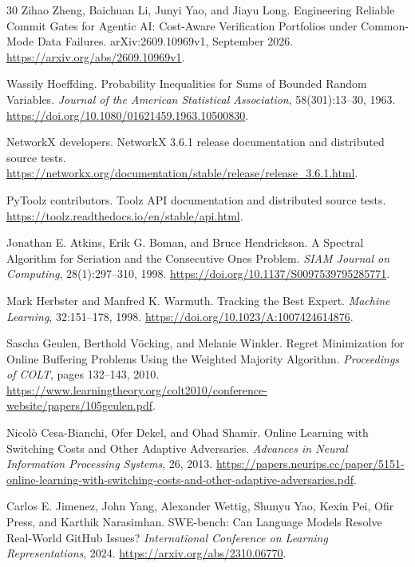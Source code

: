 \begin{thebibliography}{30}
 Zihao Zheng, Baichuan Li, Junyi Yao, and Jiayu Long.
\newblock Engineering Reliable Commit Gates for Agentic AI: Cost-Aware Verification Portfolios under Common-Mode Data Failures.
\newblock arXiv:2609.10969v1, September 2026.
\newblock \url{https://arxiv.org/abs/2609.10969v1}.

 Wassily Hoeffding.
\newblock Probability Inequalities for Sums of Bounded Random Variables.
\newblock \emph{Journal of the American Statistical Association}, 58(301):13--30, 1963.
\newblock \url{https://doi.org/10.1080/01621459.1963.10500830}.

 NetworkX developers.
\newblock NetworkX 3.6.1 release documentation and distributed source tests.
\newblock \url{https://networkx.org/documentation/stable/release/release_3.6.1.html}.

 PyToolz contributors.
\newblock Toolz API documentation and distributed source tests.
\newblock \url{https://toolz.readthedocs.io/en/stable/api.html}.

 Jonathan E. Atkins, Erik G. Boman, and Bruce Hendrickson.
\newblock A Spectral Algorithm for Seriation and the Consecutive Ones Problem.
\newblock \emph{SIAM Journal on Computing}, 28(1):297--310, 1998.
\newblock \url{https://doi.org/10.1137/S0097539795285771}.

 Mark Herbster and Manfred K. Warmuth.
\newblock Tracking the Best Expert.
\newblock \emph{Machine Learning}, 32:151--178, 1998.
\newblock \url{https://doi.org/10.1023/A:1007424614876}.

 Sascha Geulen, Berthold V\"ocking, and Melanie Winkler.
\newblock Regret Minimization for Online Buffering Problems Using the Weighted Majority Algorithm.
\newblock \emph{Proceedings of COLT}, pages 132--143, 2010.
\newblock \url{https://www.learningtheory.org/colt2010/conference-website/papers/105geulen.pdf}.

 Nicol\`o Cesa-Bianchi, Ofer Dekel, and Ohad Shamir.
\newblock Online Learning with Switching Costs and Other Adaptive Adversaries.
\newblock \emph{Advances in Neural Information Processing Systems}, 26, 2013.
\newblock \url{https://papers.neurips.cc/paper/5151-online-learning-with-switching-costs-and-other-adaptive-adversaries.pdf}.

 Carlos E. Jimenez, John Yang, Alexander Wettig, Shunyu Yao, Kexin Pei, Ofir Press, and Karthik Narasimhan.
\newblock SWE-bench: Can Language Models Resolve Real-World GitHub Issues?
\newblock \emph{International Conference on Learning Representations}, 2024.
\newblock \url{https://arxiv.org/abs/2310.06770}.


\end{thebibliography}
